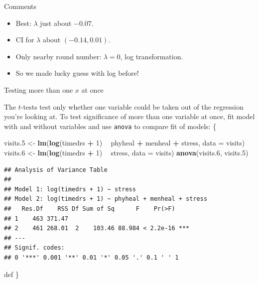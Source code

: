 \documentclass[ignorenonframetext,]{beamer}
\newenvironment{Shaded}{\begin{snugshade}}{\end{snugshade}}
\newcommand{\DataTypeTok}[1]{\textcolor[rgb]{0.13,0.29,0.53}{#1}}
\newcommand{\DecValTok}[1]{\textcolor[rgb]{0.00,0.00,0.81}{#1}}
\newcommand{\FloatTok}[1]{\textcolor[rgb]{0.00,0.00,0.81}{#1}}
\newcommand{\KeywordTok}[1]{\textcolor[rgb]{0.13,0.29,0.53}{\textbf{#1}}}
\newcommand{\NormalTok}[1]{#1}
\newcommand{\OperatorTok}[1]{\textcolor[rgb]{0.81,0.36,0.00}{\textbf{#1}}}
\newcommand{\StringTok}[1]{\textcolor[rgb]{0.31,0.60,0.02}{#1}}
\begin{document}
\begin{frame}{Comments}
\protect\hypertarget{comments-6}{}

\begin{itemize}
\item
  Best: \(\lambda\) just about \(-0.07\).
\item
  CI for \(\lambda\) about \((-0.14,0.01)\).
\item
  Only nearby round number: \(\lambda=0\), log transformation.
\item
  So we made lucky guess with log before!
\end{itemize}

\end{frame}

\begin{frame}[fragile]{Testing more than one \(x\) at once}
\protect\hypertarget{testing-more-than-one-x-at-once}{}

The \(t\)-tests test only whether one variable could be taken out of the
regression you're looking at. To test significance of more than one
variable at once, fit model with and without variables and use
\texttt{anova} to compare fit of models: \{\small

\begin{Shaded}
\begin{Highlighting}[]
\NormalTok{visits}\FloatTok{.5}\NormalTok{ <-}\StringTok{ }\KeywordTok{lm}\NormalTok{(}\KeywordTok{log}\NormalTok{(timedrs }\OperatorTok{+}\StringTok{ }\DecValTok{1}\NormalTok{) }\OperatorTok{~}\StringTok{ }\NormalTok{phyheal }\OperatorTok{+}\StringTok{ }\NormalTok{menheal }\OperatorTok{+}\StringTok{ }\NormalTok{stress, }\DataTypeTok{data =}\NormalTok{ visits)}
\NormalTok{visits}\FloatTok{.6}\NormalTok{ <-}\StringTok{ }\KeywordTok{lm}\NormalTok{(}\KeywordTok{log}\NormalTok{(timedrs }\OperatorTok{+}\StringTok{ }\DecValTok{1}\NormalTok{) }\OperatorTok{~}\StringTok{ }\NormalTok{stress, }\DataTypeTok{data =}\NormalTok{ visits)}
\KeywordTok{anova}\NormalTok{(visits}\FloatTok{.6}\NormalTok{, visits}\FloatTok{.5}\NormalTok{)}
\end{Highlighting}
\end{Shaded}

\begin{verbatim}
## Analysis of Variance Table
## 
## Model 1: log(timedrs + 1) ~ stress
## Model 2: log(timedrs + 1) ~ phyheal + menheal + stress
##   Res.Df    RSS Df Sum of Sq      F    Pr(>F)    
## 1    463 371.47                                  
## 2    461 268.01  2    103.46 88.984 < 2.2e-16 ***
## ---
## Signif. codes:  
## 0 '***' 0.001 '**' 0.01 '*' 0.05 '.' 0.1 ' ' 1
\end{verbatim}

def \}

\end{frame}
\end{document}
